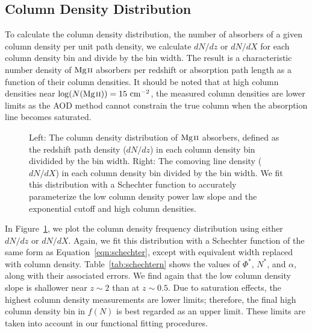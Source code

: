 \documentclass[iop,apj,numberedappendix,appendixfloats,twocolappendix]{emulateapj}
\begin{document}
\subsection{Column Density Distribution}
\label{sec:logndistro}

To calculate the column density distribution, the number of absorbers of a given column density per unit path density, we calculate $dN\!/dz$ or $dN\!/dX$ for each column density bin and divide by the bin width. The result is a characteristic number density of ${\hbox{{\rm Mg}\kern 0.1em{\sc ii}}}$ absorbers per redshift or absorption path length as a function of their column densities. It should be noted that at high column densities near $\log (N({\hbox{{\rm Mg}\kern 0.1em{\sc ii}}})) = 15~\mathrm{cm^{-2}}$, the measured column densities are lower limits as the AOD method cannot constrain the true column when the absorption line becomes saturated.

\begin{figure*}[bth]
\caption{Left: The column density distribution of ${\hbox{{\rm Mg}\kern 0.1em{\sc ii}}}$ absorbers, defined as the redshift path density ($dN\!/dz$) in each column density bin dividided by the bin width. Right: The comoving line density ($dN\!/dX$) in each column density bin divided by the bin width. We fit this distribution with a Schechter function to accurately parameterize the low column density power law slope and the exponential cutoff and high column densities.}
\label{fig:logndistro}
\end{figure*}

In Figure~\ref{fig:logndistro}, we plot the column density frequency distribution using either $dN\!/dz$ or $dN\!/dX$. Again, we fit this distribution with a Schechter function of the same form as Equation~\ref{eqn:schechter}, except with equivalent width replaced with column density. Table~\ref{tab:schechtern} shows the values of $\Phi^*$, $N^*$, and $\alpha$, along with their associated errors. We find again that the low column density slope is shallower near $z \sim 2$ than at $z \sim 0.5$. Due to saturation effects, the highest column density measurements are lower limits; therefore, the final high column density bin in $f(N)$ is best regarded as an upper limit. These limits are taken into account in our functional fitting procedures.
\end{document}
